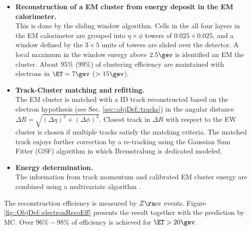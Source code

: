 \begin{itemize}
\item \textbf{Reconstruction of a EM cluster from energy deposit in the EM calorimeter.} \\
This is done by the sliding window algorithm. Cells in the all four layers in the EM calorimeter are grouped into $\eta\times\phi$ towers of $0.025\times0.025$, and a window defined by the $3\times5$ units of towers are slided over the detector. A local maximum in the window energy above $2.5\gev$ is identified an EM the cluster. About $95\%$ ($99\%$) of clustering efficiency are maintained with electrons in $\ET=7 \gev$ ($>15 \gev$).

\item \textbf{Track-Cluster matching and refitting.} \\
The EM cluster is matched with a ID track reconstructed based on the electron hypothesis (see Sec. \ref{sec::objDef::tracks}) in the angular distance $\Delta R = \sqrt{(\Delta \eta)^2+(\Delta \phi)^2}$.
Closest track in $\Delta R$ with respect to the EW cluster is chosen if multiple tracks satisfy the matching criteria.
The matched track enjoys further correction by a re-tracking using the Gaussian Sum Fitter (GSF) \cite{158_GSF} algorithm in which Bremstralung is dedicated modeled.

\item \textbf{Energy determination.} \\
The information from track momentum and calibrated EM cluster energy are combined using a multivariate algorithm \cite{161_egammaCalibRun1}.
\end{itemize}

The reconstruction efficiency is measured by $Z\ra ee$ events. Figure \ref{fig::ObjDef::electronRecoEff} presents the result together with the prediction by MC. Over $96\%-98\%$ of efficiency is achieved for $\ET>20\gev$.



